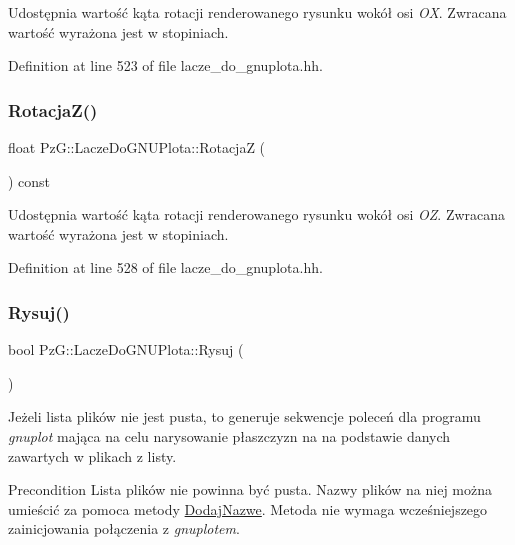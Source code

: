 Udostępnia wartość kąta rotacji renderowanego rysunku wokół osi {\itshape OX}. Zwracana wartość wyrażona jest w stopiniach. 

Definition at line 523 of file lacze\+\_\+do\+\_\+gnuplota.\+hh.

\mbox{\label{class_pz_g_1_1_lacze_do_g_n_u_plota_a9dac73754fab10644b287756003e9c79}} 
\subsubsection{\texorpdfstring{Rotacja\+Z()}{RotacjaZ()}}
{\footnotesize\ttfamily float Pz\+G\+::\+Lacze\+Do\+G\+N\+U\+Plota\+::\+RotacjaZ (\begin{DoxyParamCaption}{ }\end{DoxyParamCaption}) const\hspace{0.3cm}{\ttfamily [inline]}}

Udostępnia wartość kąta rotacji renderowanego rysunku wokół osi {\itshape OZ}. Zwracana wartość wyrażona jest w stopiniach. 

Definition at line 528 of file lacze\+\_\+do\+\_\+gnuplota.\+hh.

\mbox{\label{class_pz_g_1_1_lacze_do_g_n_u_plota_a065f5b8402737cc62b0ad4f66d028335}} 
\subsubsection{\texorpdfstring{Rysuj()}{Rysuj()}}
{\footnotesize\ttfamily bool Pz\+G\+::\+Lacze\+Do\+G\+N\+U\+Plota\+::\+Rysuj (\begin{DoxyParamCaption}{ }\end{DoxyParamCaption})}

Jeżeli lista plików nie jest pusta, to generuje sekwencje poleceń dla programu {\itshape gnuplot} mająca na celu narysowanie płaszczyzn na na podstawie danych zawartych w plikach z listy.

\begin{DoxyPrecond}{Precondition}
Lista plików nie powinna być pusta. Nazwy plików na niej można umieścić za pomoca metody \hyperlink{}{Dodaj\+Nazwe}. Metoda nie wymaga wcześniejszego zainicjowania połączenia z {\itshape gnuplotem}. 
\end{DoxyPrecond}

